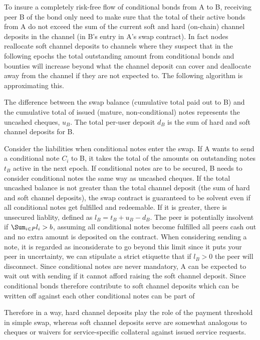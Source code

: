 To insure a completely risk-free flow of conditional bonds from A to B, receiving peer B of the bond only  need to make sure that the total of their active bonds from A do not exceed the sum of the current soft and hard (on-chain) channel  deposits in the channel (in B's entry in A's swap contract). In fact nodes reallocate soft channel deposits to channels where they suspect that in the following epochs the total outstanding amount from conditional bonds and bounties will increase beyond what the channel deposit can cover and deallocate away from the channel if they are not expected to. The following algorithm is approximating this.

The difference between the swap balance (cumulative total paid out to B) and the cumulative total of issued (mature, non-conditional) notes represents the uncashed cheques, $u_B$. The total per-user deposit $d_B$ is the sum of hard and soft channel deposits for B. 


Consider the liabilities when conditional notes enter the swap. 
If A wants to send a conditional note $C_i$ to B, it takes the total of the amounts on outstanding  notes $t_B$ active in the next epoch. 
If conditional notes are to be secured, B needs to consider conditional notes the same way as uncashed cheques. If the total uncashed balance is not greater than the total channel deposit (the sum of hard and soft channel deposits), the swap contract is guaranteed to be solvent even if all conditional notes get fulfilled and redeemable. If it is greater, there is unsecured liablity, defined as $l_B = t_B + u_B - d_B$. The peer is potentially insolvent if $\Sum_{i\in P}l_i > b$, assuming all conditional notes become fulfilled all peers cash out and no extra amount is deposited on the contract. 
When considering sending a note, it is regarded as inconsiderate to go beyond this limit since it puts your peer in uncertainty, we can stipulate a strict etiquette that if $l_B > 0$ the peer will disconnect. 
Since conditional notes are never mandatory, A can be expected to wait out with sending if it cannot afford raising the soft channel deposit. 
Since conditional bonds therefore contribute to soft channel deposits which can be written off against each other conditional notes can be part of 




Therefore in a way, hard channel deposits play the role of the payment  threshold in simple swap, whereas soft channel deposits serve are somewhat analogous to cheques or waivers for service-specific collateral against issued service requests. 

